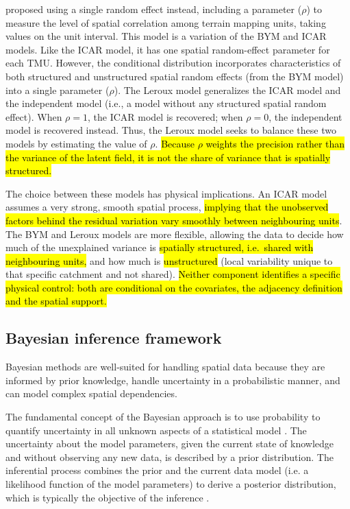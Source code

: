 \documentclass[journal abbreviation, manuscript]{copernicus}
\newcommand{\hlE}[1]{{\sethlcolor{edcyan}\hl{#1}}}
\begin{document}
\citet{leroux2000estimation} proposed using a single random effect instead, including a parameter ($\rho$) to measure the level of spatial correlation among terrain mapping units, taking values on the unit interval. This model is a variation of the BYM and ICAR models. Like the ICAR model, it has one spatial random-effect parameter for each TMU. However, the conditional distribution incorporates characteristics of both structured and unstructured spatial random effects (from the BYM model) into a single parameter ($\rho$). The Leroux model generalizes the ICAR model and the independent model (i.e., a model without any structured spatial random effect). When $\rho = 1$, the ICAR model is recovered; when $\rho = 0$, the independent model is recovered instead. Thus, the Leroux model seeks to balance these two models by estimating the value of $\rho$. \hlE{Because $\rho$ weights the precision rather than the variance of the latent field, it is not the share of variance that is spatially structured.}

The choice between these models has physical implications. An ICAR model assumes a very strong, smooth spatial process, \hlE{implying that the unobserved factors behind the residual variation vary smoothly between neighbouring units}. The BYM and Leroux models are more flexible, allowing the data to decide how much of the unexplained variance is \hlE{spatially structured, i.e.~shared with neighbouring units,} and how much is \hlE{unstructured} (local variability unique to that specific catchment and not shared). \hlE{Neither component identifies a specific physical control: both are conditional on the covariates, the adjacency definition and the spatial support.}


\subsection{Bayesian inference framework}\label{subsec23}

Bayesian methods are well-suited for handling spatial data because they are informed by prior knowledge, handle uncertainty in a probabilistic manner, and can model complex spatial dependencies.

The fundamental concept of the Bayesian approach is to use probability to quantify uncertainty in all unknown aspects of a statistical model \citep{johnson2022bayes}. The uncertainty about the model parameters, given the current state of knowledge and without observing any new data, is described by a prior distribution. The inferential process combines the prior and the current data model (i.e. a likelihood function of the model parameters) to derive a posterior distribution, which is typically the objective of the inference \citep{congdon2014applied}.
\end{document}
